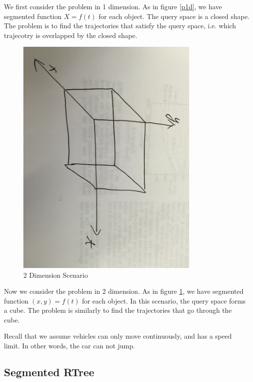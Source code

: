 \documentclass{vldb}
\begin{document}
We first consider the problem in 1 dimension.
As in figure \ref{p1d},
we have segmented function $X=f(t)$ for each object.
The query space is a closed shape.
The problem is to find the trajectories that satisfy the query space,
i.e. which trajecotry is overlapped by the closed shape.

\begin{figure}[ht!]
  \centering
  \includegraphics[width=90mm]{p2d.jpg}
  \caption{2 Dimension Scenario \label{p2d}}
\end{figure}

Now we consider the problem in 2 dimension.
As in figure \ref{p2d},
we have segmented function $(x,y) = f(t)$ for each object.
In this scenario, the query space forms a cube.
The problem is similarly to find the trajectories that go through the cube.

Recall that we assume vehicles can only move continuously,
and has a speed limit.
In other words, the car can not jump.

\subsection{Segmented RTree}
\end{document}
